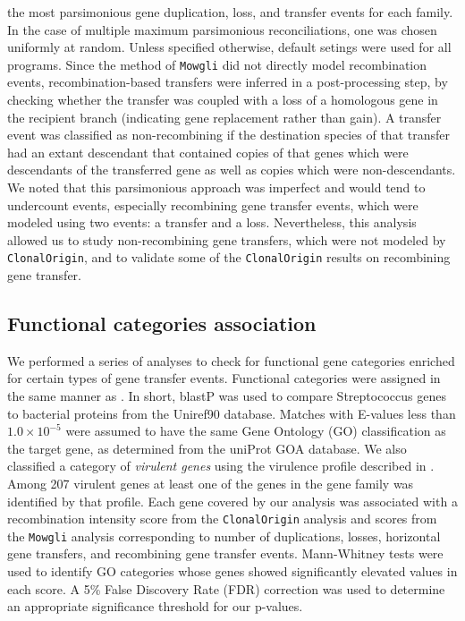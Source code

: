 \documentclass[english]{article}
\begin{document}
the most parsimonious gene duplication, loss, and transfer events for each
family.  In the case of multiple maximum parsimonious reconciliations, one was
chosen uniformly at random.  Unless specified otherwise, default setings were
used for all programs.  Since the method of \texttt{Mowgli} did not directly
model recombination events, recombination-based transfers were inferred in a
post-processing step, by checking whether the transfer was coupled with a loss
of a homologous gene in the recipient branch (indicating gene replacement rather
than gain).  A transfer event was classified as non-recombining if the
destination species of that transfer had an extant descendant that contained
copies of that genes which were descendants of the transferred gene as well as
copies which were non-descendants.  We noted that this parsimonious approach was
imperfect and would tend to undercount events, especially recombining gene
transfer events, which were modeled using two events: a transfer and a loss.
Nevertheless, this analysis allowed us to study non-recombining gene transfers,
which were not modeled by \texttt{ClonalOrigin}, and to validate some of the
\texttt{ClonalOrigin} results on recombining gene transfer.  

\subsection{Functional categories association}

We performed a series of analyses to check for functional gene categories
enriched for certain types of gene transfer events. Functional categories were
assigned in the same manner as \citet{Suzuki2011}. In short, blastP was used to
compare Streptococcus genes to bacterial proteins from the Uniref90 database.
Matches with E-values less than $1.0\times10^{-5}$ were assumed to have the same
Gene Ontology (GO) classification as the target gene, as determined from the
uniProt GOA database.  We also classified a category of  \textit{virulent genes}
using the virulence profile described in \citet{Suzuki2011}. Among 207 virulent
genes at least one of the genes in the gene family was identified by that
profile.  Each gene covered by our analysis was associated with a recombination
intensity score from the \texttt{ClonalOrigin} analysis and scores from the
\texttt{Mowgli} analysis corresponding to number of duplications, losses,
horizontal gene transfers, and recombining gene transfer events.  Mann-Whitney
tests were used to identify GO categories whose genes showed significantly
elevated values in each score.  A 5\% False Discovery Rate (FDR) correction
\citep{Benjamini1995} was used to determine an appropriate significance
threshold for our p-values.
\end{document}
